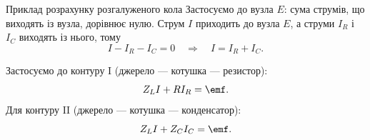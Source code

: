 \begin{Example}{Приклад розрахунку розгалуженого кола}
Застосуємо  до вузла $E$: сума струмів, що виходять із вузла, дорівнює нулю. Струм $I$ приходить до вузла $E$, а струми $I_R$ і $I_C$ виходять із нього, тому
\begin{equation}\label{eq:example_KCL}
	I - I_R - I_C = 0
	\quad\Rightarrow\quad
	I = I_R + I_C.
\end{equation}

Застосуємо  до контуру I (джерело --- котушка --- резистор):
\begin{equation}\label{eq:example_KVL_I}
	Z_L I + R I_R = \emf.
\end{equation}
Для контуру II (джерело --- котушка --- конденсатор):
\begin{equation}\label{eq:example_KVL_II}
	Z_L I + Z_C I_C = \emf.
\end{equation}


\end{Example}
